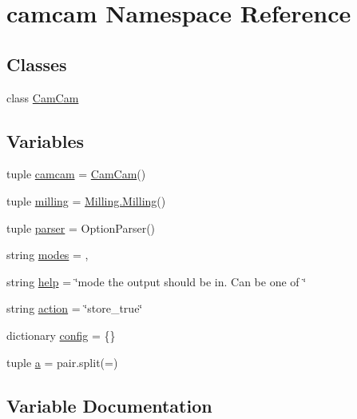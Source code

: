 \hypertarget{namespacecamcam}{}\section{camcam Namespace Reference}
\label{namespacecamcam}
\subsection*{Classes}
\begin{DoxyCompactItemize}
\item 
class \hyperlink{classcamcam_1_1_cam_cam}{Cam\+Cam}
\end{DoxyCompactItemize}
\subsection*{Variables}
\begin{DoxyCompactItemize}
\item 
tuple \hyperlink{namespacecamcam_ae3b479160a02c3c139a79592025c3d1b}{camcam} = \hyperlink{classcamcam_1_1_cam_cam}{Cam\+Cam}()
\item 
tuple \hyperlink{namespacecamcam_aa70cd4db1c1fbbbdaa24f25cd8c8a62f}{milling} = \hyperlink{class_milling_1_1_milling}{Milling.\+Milling}()
\item 
tuple \hyperlink{namespacecamcam_aade6d80745c83b5d4277022028580701}{parser} = Option\+Parser()
\item 
string \hyperlink{namespacecamcam_a6c00ac1541fda0143382c4edb61b1252}{modes} = \textquotesingle{},\textquotesingle{}
\item 
string \hyperlink{namespacecamcam_a351a3f5dcbdb051846c8f8c4c0324f8a}{help} = \char`\"{}mode the output should be in. Can be one of \char`\"{}
\item 
string \hyperlink{namespacecamcam_a0122eec4817954e15d5f9edefce524fc}{action} = \char`\"{}store\+\_\+true\char`\"{}
\item 
dictionary \hyperlink{namespacecamcam_added01231f61d35e10fa48a4cdeede8a}{config} = \{\}
\item 
tuple \hyperlink{namespacecamcam_a153362c1b392b8de0a98d4b93f10638c}{a} = pair.\+split(\textquotesingle{}=\textquotesingle{})
\end{DoxyCompactItemize}


\subsection{Variable Documentation}
\hypertarget{namespacecamcam_a153362c1b392b8de0a98d4b93f10638c}{}
